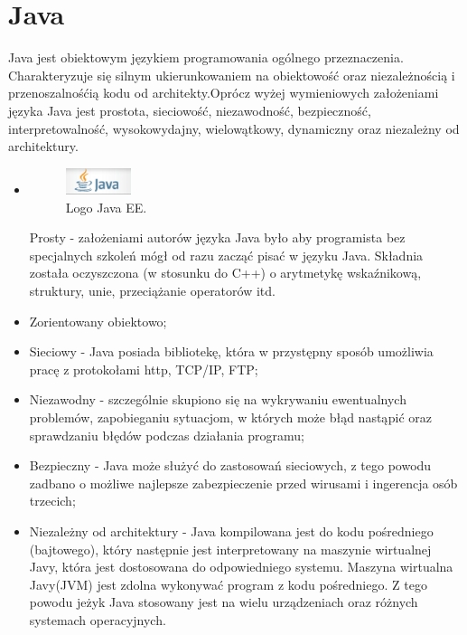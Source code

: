 \documentclass[eng,printmode,oneside]{mgr}
\begin{document}
\section{Java}

Java jest obiektowym językiem programowania ogólnego przeznaczenia.
Charakteryzuje się silnym ukierunkowaniem na obiektowość oraz niezależnością i
przenoszalnośćią kodu od architekty.Oprócz wyżej wymieniowych założeniami języka
Java jest prostota, sieciowość, niezawodność, bezpieczność, interpretowalność, wysokowydajny,
wielowątkowy, dynamiczny oraz niezależny od architektury. 

\begin{itemize}
  \item  \parbox[t]{\dimexpr\textwidth-\leftmargin}{
      \vspace{-2.5mm}
    \begin{figure}
	\centering
	\includegraphics[width=0.18\textwidth]{javaEE.png}
	\caption{\label{fig:javaEE}Logo Java EE.}
	\end{figure}
  Prosty - założeniami autorów języka Java było aby programista bez
  specjalnych szkoleń mógł od razu zacząć pisać w języku Java. Składnia została
  oczyszczona (w stosunku do C++) o arytmetykę wskaźnikową, struktury, unie,
  przeciążanie operatorów itd. 
	}
  \item Zorientowany obiektowo;
  \item Sieciowy - Java posiada bibliotekę, która w przystępny sposób umożliwia
  pracę z protokołami http, TCP/IP, FTP;
  \item Niezawodny - szczególnie skupiono się na wykrywaniu ewentualnych
  problemów, zapobieganiu sytuacjom, w których może błąd nastąpić oraz
  sprawdzaniu błędów podczas działania programu;
  \item Bezpieczny - Java może służyć do zastosowań sieciowych, z tego powodu
  zadbano o możliwe najlepsze zabezpieczenie przed wirusami i ingerencja osób
  trzecich;
  \item Niezależny od architektury - Java kompilowana jest do kodu pośredniego
  (bajtowego), który następnie jest interpretowany na maszynie wirtualnej Javy,
  która jest dostosowana do odpowiedniego systemu. Maszyna wirtualna Javy(JVM)
  jest zdolna wykonywać program z kodu pośredniego. Z tego powodu jeżyk Java
  stosowany jest na wielu urządzeniach oraz różnych systemach operacyjnych.

\end{itemize}
\end{document}
